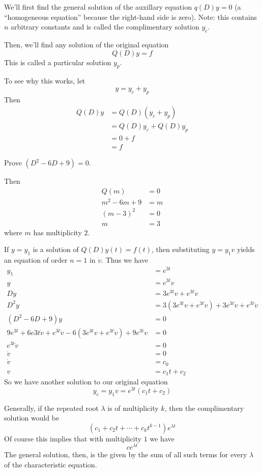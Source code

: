 \documentclass[12pt]{article}
\begin{document}
\begin{example}
We'll first find the general solution of the auxillary equation $q(D)y = 0$ (a ``homogeneous equation'' because the right-hand side is zero). Note: this contains $n$ arbitrary constants and is called the complimentary solution $y_c$.

Then, we'll find any solution of the original equation \[ Q(D)y = f \] This is called a particular solution $y_p$.

To see why this works, let \[ y = y_c + y_p \] Then
\begin{align*}
Q(D)y &= Q(D)(y_c + y_p)\\
&= Q(D)y_c + Q(D)y_p\\
&= 0 + f\\
&= f
\end{align*}
\end{example}

\begin{example}
Prove $(D^2 - 6D + 9) = 0$.

Then
\begin{align*}
Q(m) &= 0\\
m^2 -6m + 9 &= m\\
{(m - 3)}^2 &= 0\\
m &= 3
\end{align*}
where $m$ has multiplicity $2$.

If $y = y_1$ is a solution of $Q(D)y(t) = f(t)$, then substituting $y = y_1v$ yields an equation of order $n=1$ in $\dot v$. Thus we have
\begin{align*}
y_1 &= e^{3t}\\
y &= e^{3t}v\\
Dy &= 3e^{3t}v + e^{3t}\dot v\\
D^2y &= 3(3e^{3t}v + e^{3t}\dot v) + 3e^{3t}\dot v + e^{3t} \ddot v\\
(D^2 - 6D +9)y &= 0\\
9e^{3t} + 6e{3t} \dot v + e^{3t} \ddot v -6 (3e^{3t}v + e^{3t}\dot v) + 9e^{3t} v &= 0\\
e^{3t} \ddot v &= 0\\
\ddot v &= 0\\
\dot v &= c_0\\
v &= c_1t + c_2
\end{align*}
So we have another solution to our original equation \[ y_c = y_1v = e^{3t} (c_1 t + c_2) \]
\end{example}

Generally, if the repeated root $\lambda$ is of multiplicity $k$, then the complimentary solution would be \[ (c_1 + c_2t + \cdots + c_k t^{k-1})e^{\lambda t} \] Of course this implies that with multiplicity $1$ we have \[ ce^{\lambda t} \] The general solution, then, is the given by the sum of all such terms for every $\lambda$ of the characteristic equation.
\end{document}
